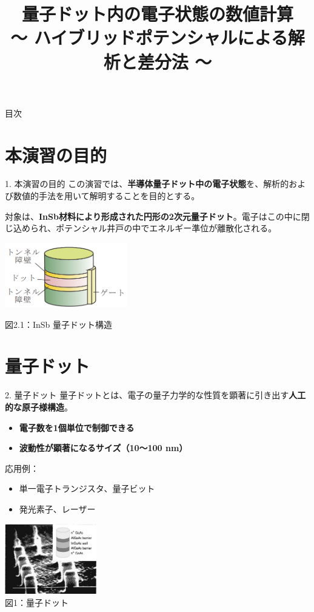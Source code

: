 \documentclass{beamer}
\title{量子ドット内の電子状態の数値計算\\ ～ ハイブリッドポテンシャルによる解析と差分法 ～}
\author{}
\date{}
\begin{document}
\frame{\titlepage}

\begin{frame}{目次}
\tableofcontents
\end{frame}

\section{本演習の目的}
\begin{frame}{1. 本演習の目的}
この演習では、\textbf{半導体量子ドット中の電子状態}を、解析的および数値的手法を用いて解明することを目的とする。

対象は、\textbf{InSb材料により形成された円形の2次元量子ドット}。電子はこの中に閉じ込められ、ポテンシャル井戸の中でエネルギー準位が離散化される。

\begin{center}
  \includegraphics[width=0.4\textwidth]{images/ドット.png}
  
  図2.1：InSb 量子ドット構造
\end{center}
\end{frame}

\section{量子ドット}
\begin{frame}{2. 量子ドット}
量子ドットとは、電子の量子力学的な性質を顕著に引き出す\textbf{人工的な原子様構造}。

\begin{itemize}
\item \textbf{電子数を1個単位で制御できる}
\item \textbf{波動性が顕著になるサイズ（10〜100 nm）}
\end{itemize}

\medskip
応用例：
\begin{itemize}
\item 単一電子トランジスタ、量子ビット
\item 発光素子、レーザー
\end{itemize}

\begin{flushright}
  \includegraphics[width=0.3\textwidth]{images/量子ドット.png}\\
  図1：量子ドット
\end{flushright}
\end{frame}
\end{document}
